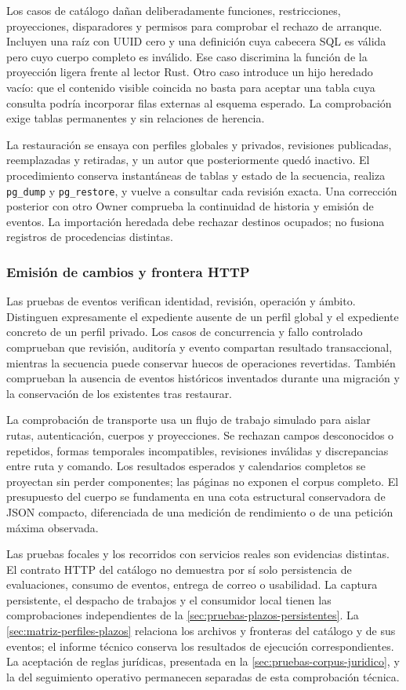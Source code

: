 Los casos de catálogo dañan deliberadamente funciones, restricciones, proyecciones, disparadores y permisos para comprobar el rechazo de arranque. Incluyen una raíz con UUID cero y una definición cuya cabecera SQL es válida pero cuyo cuerpo completo es inválido. Ese caso discrimina la función de la proyección ligera frente al lector Rust. Otro caso introduce un hijo heredado vacío: que el contenido visible coincida no basta para aceptar una tabla cuya consulta podría incorporar filas externas al esquema esperado. La comprobación exige tablas permanentes y sin relaciones de herencia.

La restauración se ensaya con perfiles globales y privados, revisiones publicadas, reemplazadas y retiradas, y un autor que posteriormente quedó inactivo. El procedimiento conserva instantáneas de tablas y estado de la secuencia, realiza \texttt{pg\_dump} y \texttt{pg\_restore}, y vuelve a consultar cada revisión exacta. Una corrección posterior con otro Owner comprueba la continuidad de historia y emisión de eventos. La importación heredada debe rechazar destinos ocupados; no fusiona registros de procedencias distintas.

\subsubsection{Emisión de cambios y frontera HTTP}

Las pruebas de eventos verifican identidad, revisión, operación y ámbito. Distinguen expresamente el expediente ausente de un perfil global y el expediente concreto de un perfil privado. Los casos de concurrencia y fallo controlado comprueban que revisión, auditoría y evento compartan resultado transaccional, mientras la secuencia puede conservar huecos de operaciones revertidas. También comprueban la ausencia de eventos históricos inventados durante una migración y la conservación de los existentes tras restaurar.

La comprobación de transporte usa un flujo de trabajo simulado para aislar rutas, autenticación, cuerpos y proyecciones. Se rechazan campos desconocidos o repetidos, formas temporales incompatibles, revisiones inválidas y discrepancias entre ruta y comando. Los resultados esperados y calendarios completos se proyectan sin perder componentes; las páginas no exponen el corpus completo. El presupuesto del cuerpo se fundamenta en una cota estructural conservadora de JSON compacto, diferenciada de una medición de rendimiento o de una petición máxima observada.

Las pruebas focales y los recorridos con servicios reales son evidencias distintas. El contrato HTTP del catálogo no demuestra por sí solo persistencia de evaluaciones, consumo de eventos, entrega de correo o usabilidad. La captura persistente, el despacho de trabajos y el consumidor local tienen las comprobaciones independientes de la \cref{sec:pruebas-plazos-persistentes}. La \cref{sec:matriz-perfiles-plazos} relaciona los archivos y fronteras del catálogo y de sus eventos; el informe técnico conserva los resultados de ejecución correspondientes. La aceptación de reglas jurídicas, presentada en la \cref{sec:pruebas-corpus-juridico}, y la del seguimiento operativo permanecen separadas de esta comprobación técnica.
